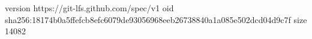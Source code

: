 version https://git-lfs.github.com/spec/v1
oid sha256:18174b0a5ffefcb8efc6079de93056968eeb26738840a1a085e502dcd04d9c7f
size 14082
